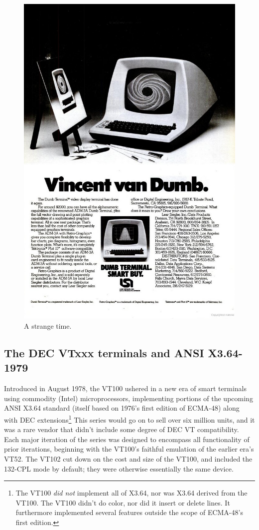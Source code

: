 \begin{figure}
  \centering
  \includegraphics[width=.8\linewidth]{media/adm3.jpeg}
  \caption[]{A strange time.}
  \label{fig:adm3}
\end{figure}

\subsection{The DEC VTxxx terminals and ANSI X3.64-1979}

Introduced in August 1978, the VT100 ushered in a new era of smart terminals
using commodity (Intel) microprocessors, implementing portions of the upcoming
ANSI X3.64 standard (itself based on 1976's first edition of ECMA-48) along
with DEC extensions\footnote{The VT100 \textit{did not} implement all of X3.64,
nor was X3.64 derived from the VT100. The VT100 didn't do color, nor did it
insert or delete lines. It furthermore implemented several features outside
the scope of ECMA-48's first edition.} This series would go on to sell over
six million units, and it was a rare vendor that didn't include some degree
of DEC VT compatibility. Each major iteration of the series was designed to
encompass all functionality of prior iterations, beginning with the VT100's
faithful emulation of the earlier era's VT52\cite{vt52}. The VT102 cut down on the cost
and size of the VT100, and included the 132-CPL mode by default; they were
otherwise essentially the same device\cite{vt100}.

